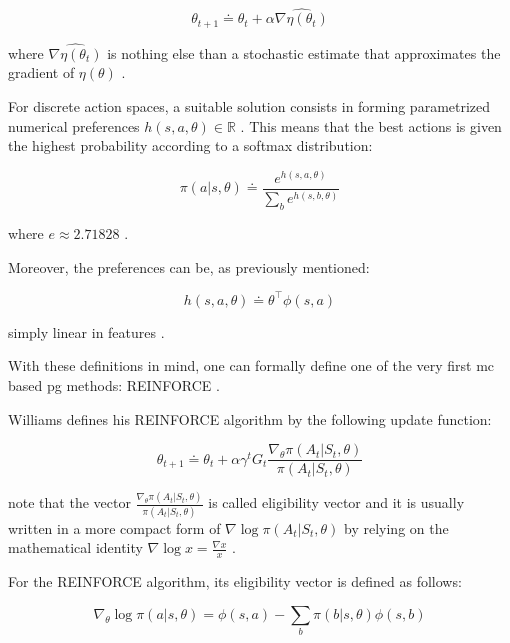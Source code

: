 \documentclass{seal_thesis}
\begin{document}
\begin{equation}
	\theta_{t+1} \doteq \theta_t + \alpha \widehat{\nabla \eta (\theta_t)}
\end{equation}

where $ \widehat{\nabla \eta (\theta_t)}$ is nothing else than a stochastic estimate that approximates the gradient of $\eta(\theta)$ \cite[p. 265]{Sutton2017}.

For discrete action spaces, a suitable solution consists in forming parametrized numerical preferences $h(s,a,\theta) \in \mathbb{R}$ \cite[p. 266]{Sutton2017}. This means that the best actions is given the highest probability according to a softmax distribution:

\begin{equation}
\label{eq:probabilistic_preferences}
	\pi(a|s,\theta) \doteq \frac{e^{h(s,a,\theta)}}{\sum_b e^{h(s,b,\theta)}}
\end{equation}

where $e \approx 2.71828$ \cite[p. 266]{Sutton2017}.

Moreover, the preferences can be, as previously mentioned:

\begin{equation}
\label{eq:dot_preferences}
	h(s,a,\theta) \doteq \theta^\top \phi (s,a)
\end{equation}

\ie simply linear in features \cite[p. 266]{Sutton2017}.

With these definitions in mind, one can formally define one of the very first \gls{mc} based \gls{pg} methods: REINFORCE \cite{Williams1992}.

Williams defines his REINFORCE algorithm by the following update function:

\begin{equation}
	\theta_{t+1} \doteq \theta_t + \alpha \gamma^t G_t \frac{\nabla_\theta \pi(A_t|S_t,\theta)}{\pi(A_t|S_t,\theta)}
\end{equation}

note that the vector $\frac{\nabla_\theta \pi(A_t|S_t,\theta)}{\pi(A_t|S_t,\theta)}$ is called eligibility vector and it is usually written in a more compact form of $\nabla \log \pi(A_t|S_t,\theta)$ by relying on the mathematical identity $\nabla \log x = \frac{\nabla x}{x}$ \cite[p. 271]{Sutton2017}.

For the REINFORCE algorithm, its eligibility vector is defined as follows:

\begin{equation}
	\nabla_\theta \log \pi (a|s,\theta) = \phi (s,a) - \sum_b \pi (b|s,\theta) \phi (s,b)
\end{equation}
\end{document}

